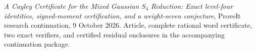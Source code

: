 \emph{A Cayley Certificate for the Mixed Gaussian $S_4$ Reduction:
Exact level-four identities, signed-moment certification, and a
weight-seven conjecture}, ProveIt research continuation, 9 October 2026.
Article, complete rational word certificate, two exact verifiers, and
certified residual enclosures in the accompanying continuation package.
